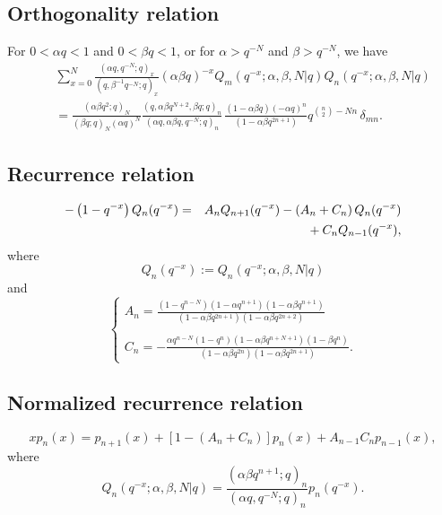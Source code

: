 \documentclass[envcountchap,graybox]{svmono}
\newcommand{\mathindent}{\hspace{7.5mm}}
\begin{document}
\subsection*{Orthogonality relation}
For $0<\alpha q<1$ and $0<\beta q<1$, or for $\alpha>q^{-N}$ and $\beta>q^{-N}$, we have
\begin{eqnarray}
\label{OrtqHahn}
& &\sum_{x=0}^N\frac{(\alpha q,q^{-N};q)_x}{(q,\beta^{-1}q^{-N};q)_x}(\alpha\beta q)^{-x}
Q_m(q^{-x};\alpha,\beta,N|q)Q_n(q^{-x};\alpha,\beta,N|q)\nonumber\\
& &{}=\frac{(\alpha\beta q^2;q)_N}{(\beta q;q)_N(\alpha q)^N}
\frac{(q,\alpha\beta q^{N+2},\beta q;q)_n}{(\alpha q,\alpha\beta q,q^{-N};q)_n}\,
\frac{(1-\alpha\beta q)(-\alpha q)^n}{(1-\alpha\beta q^{2n+1})}
q^{\binom{n}{2}-Nn}\,\delta_{mn}.
\end{eqnarray}

\newpage

\subsection*{Recurrence relation}
\begin{eqnarray}
\label{RecqHahn}
-\left(1-q^{-x}\right)Q_n(q^{-x})&=&A_nQ_{n+1}(q^{-x})-\left(A_n+C_n\right)Q_n(q^{-x})\nonumber\\
& &{}\mathindent{}+C_nQ_{n-1}(q^{-x}),
\end{eqnarray}
where
$$Q_n(q^{-x}):=Q_n(q^{-x};\alpha,\beta,N|q)$$
and
$$\left\{\begin{array}{l}
\displaystyle A_n=\frac{(1-q^{n-N})(1-\alpha q^{n+1})(1-\alpha\beta q^{n+1})}{(1-\alpha\beta q^{2n+1})(1-\alpha\beta q^{2n+2})}\\
\\
\displaystyle C_n=-\frac{\alpha q^{n-N}(1-q^n)(1-\alpha\beta q^{n+N+1})(1-\beta q^n)}{(1-\alpha\beta q^{2n})(1-\alpha\beta q^{2n+1})}.
\end{array}\right.$$

\subsection*{Normalized recurrence relation}
\begin{equation}
\label{NormRecqHahn}
xp_n(x)=p_{n+1}(x)+\left[1-(A_n+C_n)\right]p_n(x)+A_{n-1}C_np_{n-1}(x),
\end{equation}
where
$$Q_n(q^{-x};\alpha,\beta,N|q)=
\frac{(\alpha\beta q^{n+1};q)_n}{(\alpha q,q^{-N};q)_n}p_n(q^{-x}).$$
\end{document}
